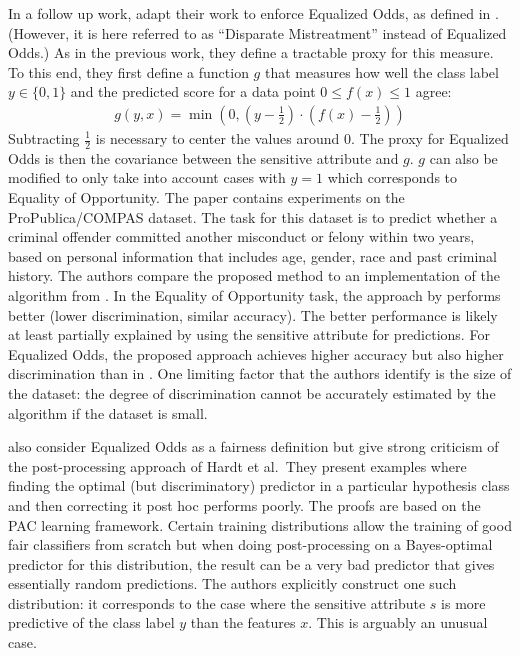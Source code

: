 In a follow up work, \citet{zafar2017fairnesstreatment} adapt their work to enforce Equalized Odds,
as defined in \citet{hardt2016equality}.
(However, it is here referred to as ``Disparate Mistreatment'' instead of Equalized Odds.)
As in the previous work, they define a tractable proxy for this measure.
To this end, they first define a function \(g\) that measures
how well the class label \(y \in \{0, 1\}\) and the predicted score for a data point \(0 \leq f(x) \leq 1\) agree:
\begin{align}
  \label{eq:zafar-constraint-2}
  g(y, x) = \min \left(0, \left(y - \tfrac{1}{2}\right) \cdot \left(f(x) - \tfrac{1}{2}\right)\right)
\end{align}
Subtracting \(\tfrac{1}{2}\) is necessary to center the values around \(0\).
The proxy for Equalized Odds is then the covariance between the sensitive attribute and \(g\).
\(g\) can also be modified to only take into account cases with \(y=1\) which corresponds to Equality of Opportunity.
The paper contains experiments on the ProPublica/COMPAS dataset.
The task for this dataset is to predict
whether a criminal offender committed another misconduct or felony within two years,
based on personal information that includes age, gender, race and past criminal history.
The authors compare the proposed method to an implementation of the algorithm from \citet{hardt2016equality}.
In the Equality of Opportunity task, the approach by \citet{hardt2016equality} performs better
(lower discrimination, similar accuracy).
The better performance is likely at least partially explained
by \citet{hardt2016equality} using the sensitive attribute for predictions.
For Equalized Odds,
the proposed approach achieves higher accuracy but also higher discrimination than in \citet{hardt2016equality}.
One limiting factor that the authors identify is the size of the dataset:
the degree of discrimination cannot be accurately estimated by the algorithm if the dataset is small.

\citet{woodworth2017learning} also consider Equalized Odds as a fairness
definition but give strong criticism of the post-processing approach of Hardt et al.~They
present examples where finding the optimal (but discriminatory) predictor in a particular
hypothesis class and then correcting it post hoc performs poorly. The proofs are based on
the PAC learning framework. Certain training distributions allow the training of good fair
classifiers from scratch but when doing post-processing on a Bayes-optimal predictor for
this distribution, the result can be a very bad predictor that gives essentially random
predictions. The authors explicitly construct one such distribution: it corresponds to the
case where the sensitive attribute \(s\) is more predictive of the class label \(y\) than the
features \(x\). This is arguably an unusual case.

